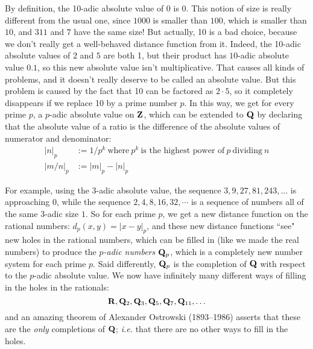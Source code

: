 \documentclass[11pt,oneside]{amsart}
\begin{document}
By definition, the 10-adic absolute value of $0$ is 0.  This notion of size 
is really different from the usual one, since $1000$ is smaller than $100$, which is smaller than $10$,
and $311$ and $7$ have the same size!  But actually, 10 is a bad choice, because we don't really get a well-behaved
distance function from it.  Indeed, the 10-adic absolute values of $2$ and $5$ are both 1, but their product has 
$10$-adic absolute value $0.1$, so this new absolute value isn't multiplicative.  That causes all kinds of problems,
and it doesn't really deserve to be called an absolute value.  But this problem is caused by the fact that 10 can be factored as $2\cdot 5$,
so it completely disappears if we replace 10 by a prime number $p$.  In this way, we get for every prime $p$,
a $p$-adic absolute value on $\mathbf{Z}$, which can be extended to $\mathbf{Q}$ by declaring that the absolute value of
a ratio is the difference of the absolute values of numerator and denominator:
\begin{align*}
	|n|_p &:= 1/p^k\ \text{where}\ p^k\ \text{is the highest power of}\ p\ \text{dividing}\ n \\
	|m/n|_p &:= |m|_p - |n|_p
\end{align*}

For example, using the $3$-adic absolute value, the sequence $3,9,27,81,243,\ldots$ is approaching 0,
while the sequence $2,4,8,16,32,\cdots$ is a sequence of numbers all of the same $3$-adic size $1$.
So for each prime $p$, we get a new distance function on the rational numbers: $d_p(x,y)=|x-y|_p$,
and these new distance functions ``see" new holes in the rational numbers, which can be filled in (like we made the real numbers)
to produce the {\em $p$-adic numbers $\mathbf{Q}_p$}, which is a completely new number system for each prime $p$.
Said differently, $\mathbf{Q}_p$ is the completion of $\mathbf{Q}$ with respect to the $p$-adic absolute value.
We now have infinitely many different ways of filling in the holes in the rationals:
$$
  \mathbf{R}, \mathbf{Q}_2, \mathbf{Q}_3, \mathbf{Q}_5, \mathbf{Q}_7, \mathbf{Q}_{11}, \ldots
$$
and an amazing theorem of Alexander Ostrowski (1893--1986) asserts that these are the {\em only} completions of $\mathbf{Q}$;
{\em i.e.} that there are no other ways to fill in the holes.
\end{document}
